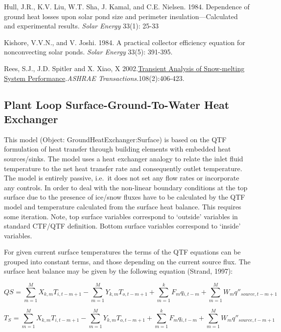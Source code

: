 Hull, J.R., K.V. Liu, W.T. Sha, J. Kamal, and C.E. Nielsen. 1984. Dependence of ground heat losses upon solar pond size and perimeter insulation---Calculated and experimental results. \emph{Solar Energy} 33(1): 25-33

Kishore, V.V.N., and V. Joshi. 1984. A practical collector efficiency equation for nonconvecting solar ponds. \emph{Solar Energy} 33(5): 391-395.

Rees, S.J., J.D. Spitler and X. Xiao, X 2002.\href{http://www.hvac.okstate.edu/pdfs/Rees_Spitler_Xiao_02.pdf}{Transient Analysis of Snow-melting System Performance}.\emph{ASHRAE Transactions.}108(2):406-423.

\subsection{Plant Loop Surface-Ground-To-Water Heat Exchanger}\label{plant-loop-surface-ground-to-water-heat-exchanger}

This model (Object: GroundHeatExchanger:Surface) is based on the QTF formulation of heat transfer through building elements with embedded heat sources/sinks. The model uses a heat exchanger analogy to relate the inlet fluid temperature to the net heat transfer rate and consequently outlet temperature. The model is entirely passive, i.e.~it does not set any flow rates or incorporate any controls. In order to deal with the non-linear boundary conditions at the top surface due to the presence of ice/snow fluxes have to be calculated by the QTF model and temperature calculated from the surface heat balance. This requires some iteration. Note, top surface variables correspond to `outside' variables in standard CTF/QTF definition. Bottom surface variables correspond to `inside' variables.

For given current surface temperatures the terms of the QTF equations can be grouped into constant terms, and those depending on the current source flux. The surface heat balance may be given by the following equation (Strand, 1997):

\begin{equation}
QS{}_{} = \sum\limits_{m = 1}^M {X{}_{k,m}} T{}_{i,t - m + 1} - \sum\limits_{m = 1}^M {Y{}_{k,m}} T{}_{o,t - m + 1} + \sum\limits_{m = 1}^k {F{}_m} q{}_{i,t - m} + \sum\limits_{m = 1}^M {W{}_m} {q''}{}_{source,t - m + 1}
\end{equation}

\begin{equation}
T{}_S{}_{} = \sum\limits_{m = 1}^M {X{}_{k,m}} T{}_{i,t - m + 1} - \sum\limits_{m = 1}^M {Y{}_{k,m}} T{}_{o,t - m + 1} + \sum\limits_{m = 1}^k {F{}_m} q{}_{i,t - m} + \sum\limits_{m = 1}^M {W{}_m} q''{}_{source,t - m + 1}
\end{equation}

